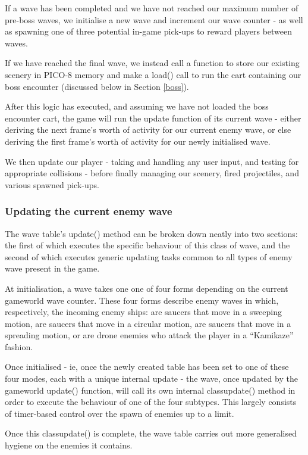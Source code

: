\documentclass[11pt]{article}
\begin{document}
If a wave has
been completed and we have not reached our maximum number of pre-boss waves,
we initialise a new wave and increment our wave counter - as well as spawning
one of three potential in-game pick-ups to reward players between waves.

If we have reached the final
wave, we instead call a function to store our existing scenery in PICO-8 memory and
make a load() call to run the cart containing our boss encounter (discussed below in
Section \ref{boss}).

After this logic has executed, and assuming we have not loaded the boss encounter
cart, the game will run the update function of its current wave - either deriving
the next frame's worth of activity for our current enemy wave, or else deriving the
first frame's worth of activity for our newly initialised wave.

We then update our player - taking and handling any user input, and testing for
appropriate collisions - before finally managing our scenery, fired projectiles,
and various spawned pick-ups.

\subsubsection*{Updating the current enemy wave}

The wave table's update() method can be broken down neatly into two sections: the first
of which executes the specific behaviour of this class of wave, and the second of
which executes generic updating tasks common to all types of enemy wave present in
the game.

At initialisation, a wave takes one one of four forms depending on the current
game\textunderscore world wave counter. These four forms describe enemy waves in which,
respectively, the incoming enemy ships: are saucers that move in a sweeping motion,
are saucers that move in a circular motion, are saucers that move in a spreading motion,
or are drone enemies who attack the player in a ``Kamikaze'' fashion.

Once initialised - ie, once the newly created table has been set to one of these
four modes, each with a unique internal update - the wave, once updated by the
game\textunderscore world update() function, will call its own internal
class\textunderscore update() method in order to execute the behaviour of one of
the four subtypes. This largely consists of timer-based control over the spawn of
enemies up to a limit.

Once this class\textunderscore update() is complete, the wave table carries out
more generalised hygiene on the enemies it contains.
\end{document}
